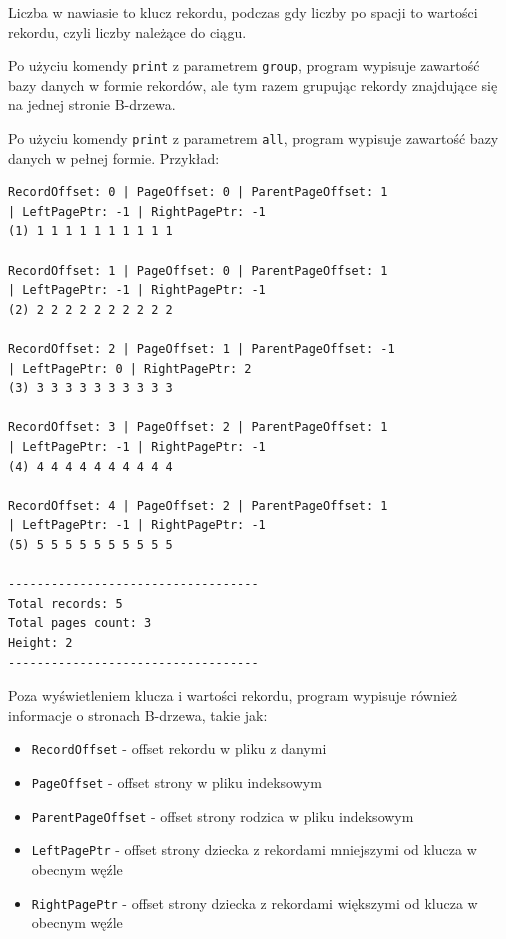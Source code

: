 \documentclass[12pt]{article}
\begin{document}
Liczba w nawiasie to klucz rekordu, podczas gdy liczby po spacji to wartości rekordu, czyli liczby należące do ciągu.

Po użyciu komendy \verb!print! z parametrem \verb!group!, program wypisuje zawartość bazy danych w formie rekordów,
ale tym razem grupując rekordy znajdujące się na jednej stronie B-drzewa.

Po użyciu komendy \verb!print! z parametrem \verb!all!, program wypisuje zawartość bazy danych w pełnej formie. Przykład:
\begin{tcolorbox}[colframe=black!75, colback=white!95, title=Output komendy \texttt{print all}]
\begin{verbatim}
RecordOffset: 0 | PageOffset: 0 | ParentPageOffset: 1 
| LeftPagePtr: -1 | RightPagePtr: -1
(1) 1 1 1 1 1 1 1 1 1 1 

RecordOffset: 1 | PageOffset: 0 | ParentPageOffset: 1 
| LeftPagePtr: -1 | RightPagePtr: -1
(2) 2 2 2 2 2 2 2 2 2 2 

RecordOffset: 2 | PageOffset: 1 | ParentPageOffset: -1 
| LeftPagePtr: 0 | RightPagePtr: 2
(3) 3 3 3 3 3 3 3 3 3 3 

RecordOffset: 3 | PageOffset: 2 | ParentPageOffset: 1 
| LeftPagePtr: -1 | RightPagePtr: -1
(4) 4 4 4 4 4 4 4 4 4 4 

RecordOffset: 4 | PageOffset: 2 | ParentPageOffset: 1 
| LeftPagePtr: -1 | RightPagePtr: -1
(5) 5 5 5 5 5 5 5 5 5 5 

-----------------------------------
Total records: 5
Total pages count: 3
Height: 2
-----------------------------------
\end{verbatim}
\end{tcolorbox}

Poza wyświetleniem klucza i wartości rekordu, program wypisuje również informacje o stronach B-drzewa, 
takie jak:
\begin{itemize}
    \item \verb!RecordOffset! - offset rekordu w pliku z danymi
    \item \verb!PageOffset! - offset strony w pliku indeksowym
    \item \verb!ParentPageOffset! - offset strony rodzica w pliku indeksowym
    \item \verb!LeftPagePtr! - offset strony dziecka z rekordami mniejszymi od klucza w obecnym węźle
    \item \verb!RightPagePtr! - offset strony dziecka z rekordami większymi od klucza w obecnym węźle
\end{itemize}
\end{document}
